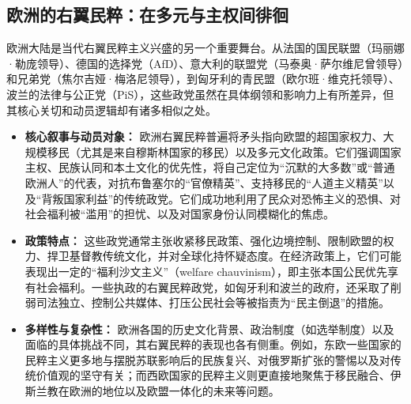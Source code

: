 \documentclass[UTF8, 10pt]{ctexbook}
\begin{document}
\subsection{欧洲的右翼民粹：在多元与主权间徘徊}
欧洲大陆是当代右翼民粹主义兴盛的另一个重要舞台。从法国的国民联盟（玛丽娜·勒庞领导）、德国的选择党（AfD）、意大利的联盟党（马泰奥·萨尔维尼曾领导）和兄弟党（焦尔吉娅·梅洛尼领导），到匈牙利的青民盟（欧尔班·维克托领导）、波兰的法律与公正党（PiS），这些政党虽然在具体纲领和影响力上有所差异，但其核心关切和动员逻辑却有诸多相似之处。
\begin{itemize}
    \item \textbf{核心叙事与动员对象：} 欧洲右翼民粹普遍将矛头指向欧盟的超国家权力、大规模移民（尤其是来自穆斯林国家的移民）以及多元文化政策。它们强调国家主权、民族认同和本土文化的优先性，将自己定位为“沉默的大多数”或“普通欧洲人”的代表，对抗布鲁塞尔的“官僚精英”、支持移民的“人道主义精英”以及“背叛国家利益”的传统政党。它们成功地利用了民众对恐怖主义的恐惧、对社会福利被“滥用”的担忧、以及对国家身份认同模糊化的焦虑。
    \item \textbf{政策特点：} 这些政党通常主张收紧移民政策、强化边境控制、限制欧盟的权力、捍卫基督教传统文化，并对全球化持怀疑态度。在经济政策上，它们可能表现出一定的“福利沙文主义”（welfare chauvinism），即主张本国公民优先享有社会福利。一些执政的右翼民粹政党，如匈牙利和波兰的政府，还采取了削弱司法独立、控制公共媒体、打压公民社会等被指责为“民主倒退”的措施。
    \item \textbf{多样性与复杂性：} 欧洲各国的历史文化背景、政治制度（如选举制度）以及面临的具体挑战不同，其右翼民粹的表现也各有侧重。例如，东欧一些国家的民粹主义更多地与摆脱苏联影响后的民族复兴、对俄罗斯扩张的警惕以及对传统价值观的坚守有关；而西欧国家的民粹主义则更直接地聚焦于移民融合、伊斯兰教在欧洲的地位以及欧盟一体化的未来等问题。
\end{itemize}
\end{document}
